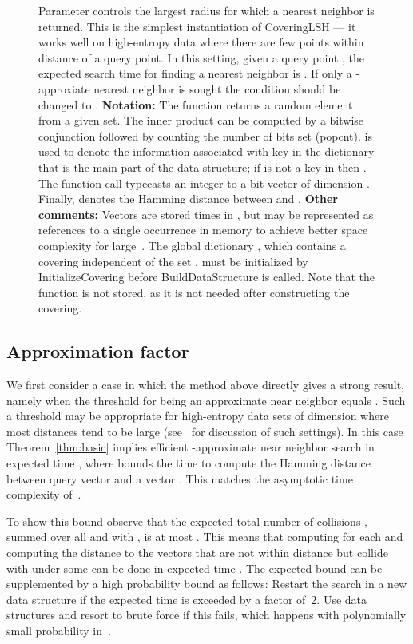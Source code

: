 \documentclass[prodmode,acmtalg]{acmsmall}
\begin{document}
\begin{figure}[t]
{Parameter  controls the largest radius for which a nearest neighbor is returned.
This is the simplest instantiation of CoveringLSH --- it works well on high-entropy data where there are few points within distance  of a query point.
In this setting, given a query point , the expected search time for finding a nearest neighbor  is . If only a -approxiate nearest neighbor is sought the condition  should be changed to . \smallskip\newline
{\bf Notation:} The function  returns a random element from a given set.
The inner product  can be computed by a bitwise conjunction followed by counting the number of bits set ({\sc popcnt}).
 is used to denote the information associated with key  in the dictionary  that is the main part of the data structure; if  is not a key in  then . 
The function call  typecasts an integer to a bit vector of dimension .
Finally,  denotes the Hamming distance between  and . 
\smallskip\newline
{\bf Other comments:} 
Vectors are stored  times in , but may be represented as references to a single occurrence in memory to achieve better space complexity for large~.
The global dictionary , which contains a covering independent of the set , must be initialized by {\sc InitializeCovering} before {\sc BuildDataStructure} is called.
Note that the function  is not stored, as it is not needed after constructing the covering.}
\label{fig:code}
\end{figure}


\subsection{Approximation factor }\label{sec:randomdata}

We first consider a case in which the method above directly gives a strong result, namely when the threshold  for being an approximate near neighbor equals .
Such a threshold may be appropriate for high-entropy data sets of dimension  where most distances tend to be large (see~\cite{kucherov2005multiseed,norouzi2012fast} for discussion of such settings).
In this case Theorem~\ref{thm:basic} implies efficient -approximate near neighbor search in expected time , where  bounds the time to compute the Hamming distance between query vector  and a vector . This matches the asymptotic time complexity of~\cite{Indyk1998}.

To show this bound observe that the expected total number of collisions , summed over all  and  with , is at most .
This means that computing  for each  and computing the distance to the vectors that are not within distance  but collide with  under some  can be done in expected time .
The expected bound can be supplemented by a high probability bound as follows: Restart the search in a new data structure if the expected time is exceeded by a factor of~2. Use  data structures and resort to brute force if this fails, which happens with polynomially small probability in~.
\end{document}
